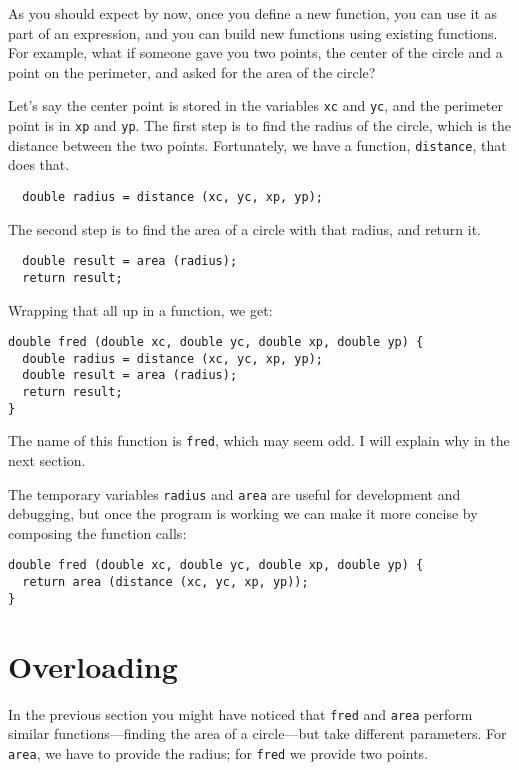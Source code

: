 As you should expect by now, once you define a new function,
you can use it as part of an expression, and you can build
new functions using existing functions.  For example, what if someone
gave you two points, the center of the circle and a point on
the perimeter, and asked for the area of the circle?

Let's say the center point is stored in the variables {\tt xc}
and {\tt yc}, and the perimeter point is in {\tt xp} and
{\tt yp}.  The first step is to find the radius of the circle, which
is the distance between the two points.  Fortunately, we have
a function, {\tt distance}, that does that.

\begin{verbatim}
  double radius = distance (xc, yc, xp, yp);
\end{verbatim}
%
The second step is to find the area of a circle with that
radius, and return it.

\begin{verbatim}
  double result = area (radius);
  return result;
\end{verbatim}
%
Wrapping that all up in a function, we get:

\begin{verbatim}
double fred (double xc, double yc, double xp, double yp) {
  double radius = distance (xc, yc, xp, yp);
  double result = area (radius);
  return result;
} 
\end{verbatim}
%
The name of this function is {\tt fred}, which may seem odd.  I will
explain why in the next section.

The temporary variables {\tt radius} and {\tt area} are
useful for development and debugging, but once the program is
working we can make it more concise by composing
the function calls:

\begin{verbatim}
double fred (double xc, double yc, double xp, double yp) {
  return area (distance (xc, yc, xp, yp));
} 
\end{verbatim}

\section{Overloading}
\label{overloading}

In the previous section you might have noticed that {\tt fred}
and {\tt area} perform similar functions---finding
the area of a circle---but take different parameters.  For
{\tt area}, we have to provide the radius; for {\tt fred}
we provide two points.

